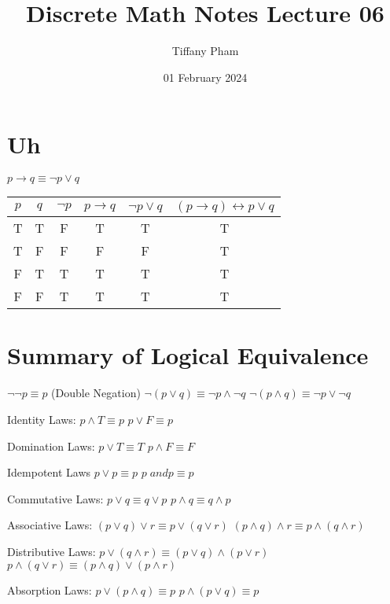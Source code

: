 \documentclass{article}
\title{Discrete Math Notes Lecture 06}
\author{Tiffany Pham}
\date{01 February 2024}
\begin{document}
\maketitle

\section{Uh}
$p\rightarrow q\equiv \lnot p\lor q$

\begin{center}
\begin{tabular}{ |c|c|c|c|c|c| } 
 \hline
 $p$ & $q$ & $\lnot p$ & $p\rightarrow q$ & $\lnot p \lor q$ & $(p\rightarrow q)\leftrightarrow p\lor q$ \\ 
 \hline
 T & T & F & T & T & T \\ 
 T & F & F & F & F & T \\
 F & T & T & T & T & T \\
 F & F & T & T & T & T \\
 \hline
\end{tabular}
\end{center}

\section{Summary of Logical Equivalence}
$\lnot \lnot p\equiv p$ (Double Negation)
\hfill \break
$\lnot(p\lor q)\equiv \lnot p\land \lnot q$
\hfill \break
$\lnot(p\land q)\equiv \lnot p\lor \lnot q$

\hfill \break
Identity Laws:
\hfill \break
$p\land T\equiv p$
\hfill \break
$p\lor F\equiv p$

\hfill \break
Domination Laws:
\hfill \break
$p\lor T\equiv T$
\hfill \break
$p\land F \equiv F$

\hfill \break
Idempotent Laws
\hfill \break
$p\lor p\equiv p$
\hfill \break
$p\;and p\equiv p$

\hfill \break
Commutative Laws:
\hfill \break
$p\lor q\equiv q\lor p$
\hfill \break
$p\land q\equiv q\land p$

\hfill \break
Associative Laws:
\hfill \break
$(p\lor q)\lor r\equiv p\lor(q\lor r)$
\hfill \break
$(p\land q)\land r\equiv p\land(q\land r)$

\hfill \break
Distributive Laws:
\hfill \break
$p\lor(q\land r)\equiv(p\lor q)\land(p\lor r)$
\hfill \break
$p\land(q\lor r)\equiv(p\land q)\lor(p\land r)$

\hfill \break
Absorption Laws:
\hfill \break
$p\lor(p\land q)\equiv p$
\hfill \break
$p\land (p\lor q)\equiv p$
\end{document}
